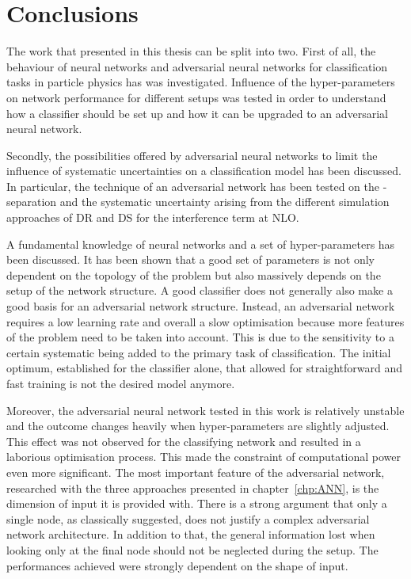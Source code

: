 \chapter{Conclusions}

The work that presented in this thesis can be split into two. First of all, the behaviour of neural networks and adversarial neural networks for classification tasks in particle physics has was investigated. Influence of the hyper-parameters on network performance for different setups was tested in order to understand how a classifier should be set up and how it can be upgraded to an adversarial neural network.

Secondly, the possibilities offered by adversarial neural networks to limit the influence of systematic uncertainties on a classification model has been discussed. In particular, the technique of an adversarial network has been tested on the \tW-\ttbar separation and the systematic uncertainty arising from the different simulation approaches of DR and DS for the interference term at NLO.

A fundamental knowledge of neural networks and a set of hyper-parameters has been discussed. It has been shown that a good set of parameters is not only dependent on the topology of the problem but also massively depends on the setup of the network structure. A good classifier does not generally also make a good basis for an adversarial network structure. Instead, an adversarial network requires a low learning rate and overall a slow optimisation because more features of the problem need to be taken into account. This is due to the sensitivity to a certain systematic being added to the primary task of classification. The initial optimum, established for the classifier alone, that allowed for straightforward and fast training is not the desired model anymore.

Moreover, the adversarial neural network tested in this work is relatively unstable and the outcome changes heavily when hyper-parameters are slightly adjusted. This effect was not observed for the classifying network and resulted in a laborious optimisation process. This made the constraint of computational power even more significant.
The most important feature of the adversarial network, researched with the three approaches presented in chapter~\ref{chp:ANN}, is the dimension of input it is provided with. There is a strong argument that only a single node, as classically suggested, does not justify a complex adversarial network architecture. In addition to that, the general information lost when looking only at the final node should not be neglected during the setup. The performances achieved were strongly dependent on the shape of input.

